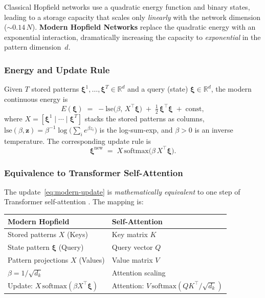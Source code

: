 Classical Hopfield networks use a quadratic energy function and binary states, leading to a storage capacity that scales only \emph{linearly} with the network dimension ($\sim 0.14\,N$).
\textbf{Modern Hopfield Networks} \cite{ModernHopfield} replace the quadratic energy with an exponential interaction, dramatically increasing the capacity to \emph{exponential} in the pattern dimension~$d$.

\subsubsection*{Energy and Update Rule}

Given $T$ stored patterns $\boldsymbol\xi^1,\dots,\boldsymbol\xi^T \in \mathbb{R}^d$ and a query (state) $\boldsymbol\xi \in \mathbb{R}^d$, the modern continuous energy is
\begin{equation}\label{eq:modern-energy}
    E(\boldsymbol\xi) \;=\; -\mathrm{lse}\!\bigl(\beta,\, X^{\!\top}\boldsymbol\xi\bigr) \;+\; \tfrac{1}{2}\,\boldsymbol\xi^{\!\top}\boldsymbol\xi \;+\; \text{const},
\end{equation}
where $X = [\boldsymbol\xi^1 \!\mid\! \cdots \!\mid\! \boldsymbol\xi^T]$ stacks the stored patterns as columns, $\mathrm{lse}(\beta, \mathbf{z}) = \beta^{-1}\log\!\bigl(\sum_i e^{\beta z_i}\bigr)$ is the log-sum-exp, and $\beta > 0$ is an inverse temperature.
The corresponding update rule is
\begin{equation}\label{eq:modern-update}
    \boldsymbol\xi^{\mathrm{new}} \;=\; X\,\mathrm{softmax}\!\bigl(\beta\, X^{\!\top}\boldsymbol\xi\bigr).
\end{equation}

\subsubsection*{Equivalence to Transformer Self-Attention}

The update~\eqref{eq:modern-update} is \emph{mathematically equivalent} to one step of Transformer self-attention \cite{Attention}.
The mapping is:

\begin{center}
\renewcommand{\arraystretch}{1.3}
\begin{tabular}{l@{\qquad$\longleftrightarrow$\qquad}l}
    \textbf{Modern Hopfield} & \textbf{Self-Attention} \\
    \hline
    Stored patterns $X$ (Keys) & Key matrix $K$ \\
    State pattern $\boldsymbol\xi$ (Query) & Query vector $Q$ \\
    Pattern projections $X$ (Values) & Value matrix $V$ \\
    $\beta = 1/\sqrt{d_k}$ & Attention scaling \\
    Update: $X\,\mathrm{softmax}(\beta X^{\!\top}\boldsymbol\xi)$ & Attention: $V\,\mathrm{softmax}(Q K^{\!\top}/\sqrt{d_k})$ \\
\end{tabular}
\end{center}


